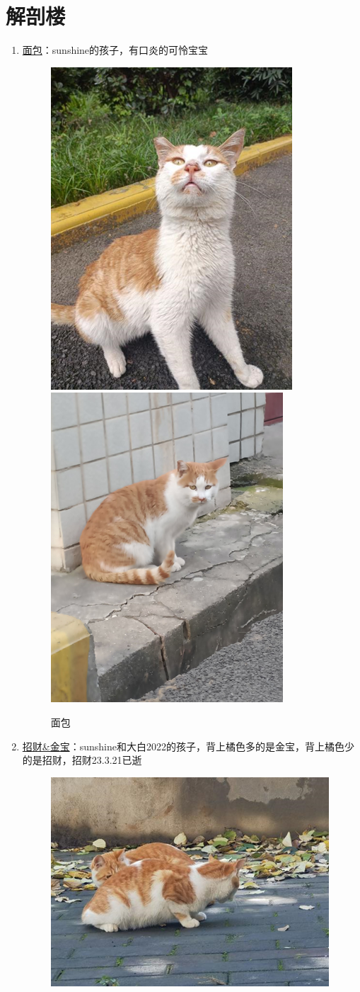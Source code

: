 \documentclass[zihao=-4,fontset=none]{Beautybook-CN}
\begin{document}
\section{解剖楼}
\begin{enumerate}
    \item \hyperref[img4344]{面包}：sunshine的孩子，有口炎的可怜宝宝
    \begin{figure}[htbp]
            \centering
            \includegraphics[width=0.4\linewidth]{media/cimage43.png}
        \qquad
            \includegraphics[width=0.4\linewidth]{media/cimage44.png}
            \caption{面包}
            \label{img4344}
    \end{figure}
        \item \hyperref[img4546]{招财\&金宝}：sunshine和大白2022的孩子，背上橘色多的是金宝，背上橘色少的是招财，招财23.3.21已逝
    \begin{figure}[htbp]
            \centering
            \includegraphics[width=0.4\linewidth]{media/cimage45.png}

\end{figure}
\end{enumerate}
\end{document}
